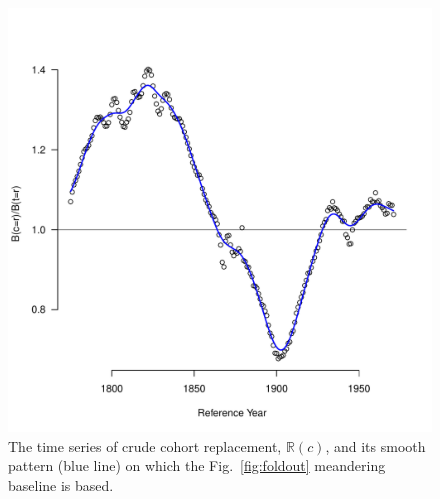 \documentclass{article}
\begin{document}
\begin{figure}[ht!]
\centering
 \includegraphics[scale=.6]{Figures/Meander.pdf}
\caption{The time series of crude cohort replacement, $\mathbb{R}(c)$, and its smooth pattern (blue line) on which the Fig.~\ref{fig:foldout} meandering baseline is based.}
\label{fig:meander}
\end{figure}
\end{document}
